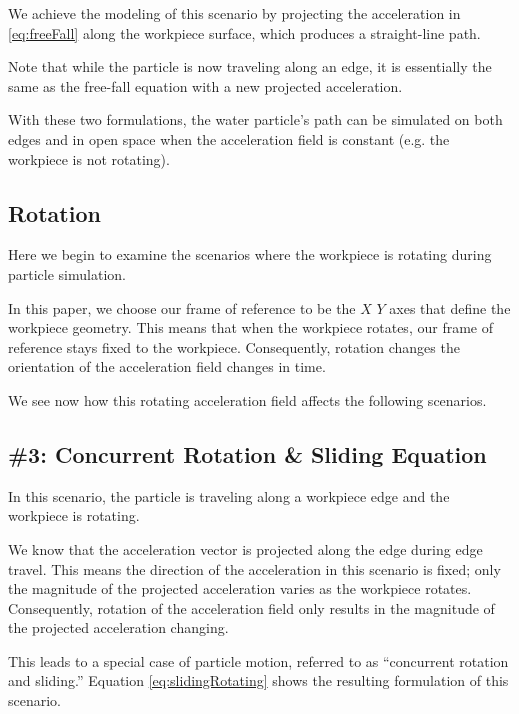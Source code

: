 We achieve the modeling of this scenario by projecting the acceleration in \eqref{eq:freeFall} along the workpiece surface, which produces a straight-line path.

Note that while the particle is now traveling along an edge, it is essentially the same as the free-fall equation with a new projected acceleration.



With these two formulations, the water particle's path can be simulated on both edges and in open space when the acceleration field is constant (e.g. the workpiece is not rotating).

		\subsection{Rotation}

Here we begin to examine the scenarios where the workpiece is rotating during particle simulation.

In this paper, we choose our frame of reference to be the $X$ $Y$ axes that define the workpiece geometry. This means that when the workpiece rotates, our frame of reference stays fixed to the workpiece. Consequently, rotation changes the orientation of the acceleration field changes in time.

We see now how this rotating acceleration field affects the following scenarios.

		\subsection{\#3: Concurrent Rotation \& Sliding Equation}

In this scenario, the particle is traveling along a workpiece edge and the workpiece is rotating.

We know that the acceleration vector is projected along the edge during edge travel. This means the direction of the acceleration in this scenario is fixed; only the magnitude of the projected acceleration varies as the workpiece rotates. Consequently, rotation of the acceleration field only results in the magnitude of the projected acceleration changing.

This leads to a special case of particle motion, referred to as ``concurrent rotation and sliding.'' Equation \eqref{eq:slidingRotating} shows the resulting formulation of this scenario.

